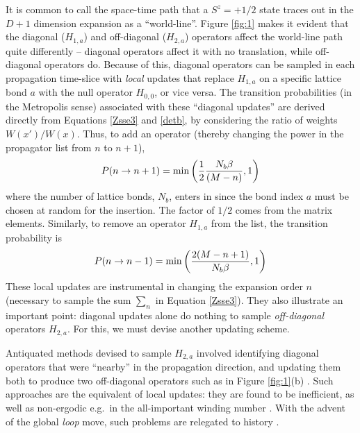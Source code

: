 \documentclass[vecphys]{svmult}
\begin{document}
It is common to call the space-time path that a $S^z=+1/2$ state traces out in the $D+1$ dimension expansion as a ``world-line''.  Figure \ref{fig:1} makes it evident that the diagonal ($H_{1,a}$) and off-diagonal ($H_{2,a}$) operators affect the world-line path quite differently -- diagonal operators affect it with no translation, while off-diagonal operators do.  Because of this, diagonal operators can be sampled in each propagation time-slice with {\em local} updates that replace $H_{1,a}$ on a specific lattice bond $a$ with the null operator $H_{0,0}$, or vice versa.  The transition probabilities (in the Metropolis sense) associated with these ``diagonal updates'' are derived directly from Equations \ref{Zsse3} and \ref{detb}, by considering the ratio of weights $W(x')/W(x)$. Thus,
to add an operator (thereby changing the power in the propagator list from $n$ to $n+1$),
\begin{eqnarray}
P(n \rightarrow n+1) = {\rm min} \left({ \frac{1}{2}\frac{N_b \beta}{(M-n)}, 1 }\right)
\end{eqnarray}
where the number of lattice bonds, $N_b$, enters in since the bond index $a$ must be chosen at random for the insertion.  The factor of $1/2$ comes from the matrix elements.  Similarly, to remove an operator $H_{1,a}$ from the list, the transition probability is
\begin{eqnarray}
P(n \rightarrow n-1) = {\rm min} \left({ \frac{2(M-n+1)}{N_b \beta}, 1 }\right)
\end{eqnarray}
These local updates are instrumental in changing the expansion order $n$ (necessary to sample the sum $\sum_n$ in Equation \ref{Zsse3}).  They also illustrate an important point: diagonal updates alone do nothing to sample {\em off-diagonal} operators $H_{2,a}$.  For this, we must devise another updating scheme.

Antiquated methods devised to sample $H_{2,a}$ involved identifying diagonal operators that were ``nearby'' in the propagation direction, and updating them both to produce two off-diagonal operators such as in Figure \ref{fig:1}(b) \cite{Melko:SandvikHeis}.  Such approaches are the equivalent of local updates: they are found to be inefficient, as well as non-ergodic e.g.~in the all-important winding number \cite{Melko:PC}.  With the advent of the global {\it loop} move, such problems are relegated to history \cite{Melko:Sandvik99,Melko:Syljuasen02}.  
\end{document}
